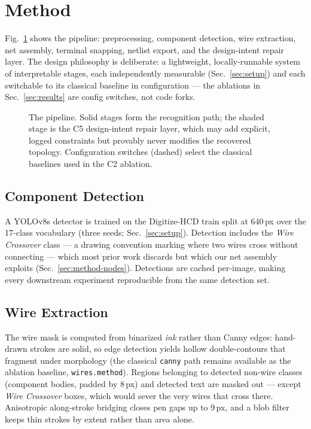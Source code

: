 \section{Method}
\label{sec:method}


Fig.~\ref{fig:pipeline} shows the pipeline: preprocessing, component
detection, wire extraction, net assembly, terminal snapping, netlist
export, and the design-intent repair layer. The design philosophy is
deliberate: a lightweight, locally-runnable system of interpretable
stages, each independently measurable (Sec.~\ref{sec:setup}) and each
switchable to its classical baseline in configuration — the ablations
in Sec.~\ref{sec:results} are config switches, not code forks.

\begin{figure}[t]
  \centering
  
  \caption{The pipeline. Solid stages form the recognition path;
  the shaded stage is the C5 design-intent repair layer, which may
  add explicit, logged constraints but provably never modifies the
  recovered topology. Configuration switches (dashed) select the
  classical baselines used in the C2 ablation.}
  \label{fig:pipeline}
\end{figure}

\subsection{Component Detection}
\label{sec:method-detect}
A YOLOv8s \cite{yolov8} detector is trained on the Digitize-HCD train
split at $640$\,px over the 17-class vocabulary (three seeds;
Sec.~\ref{sec:setup}). Detection includes the \emph{Wire Crossover}
class — a drawing convention marking where two wires cross without
connecting — which most prior work discards but which our net assembly
exploits (Sec.~\ref{sec:method-nodes}). Detections are cached
per-image, making every downstream experiment reproducible from the
same detection set.

\subsection{Wire Extraction}
\label{sec:method-wires}
The wire mask is computed from binarized \emph{ink} rather than Canny
edges: hand-drawn strokes are solid, so edge detection yields hollow
double-contours that fragment under morphology (the classical
\texttt{canny} path remains available as the ablation baseline,
\texttt{wires.method}). Regions belonging to detected non-wire classes
(component bodies, padded by 8\,px) and detected text are masked out —
except \emph{Wire Crossover} boxes, which would sever the very wires
that cross there. Anisotropic along-stroke bridging closes pen gaps up
to 9\,px, and a blob filter keeps thin strokes by extent rather than
area alone.

